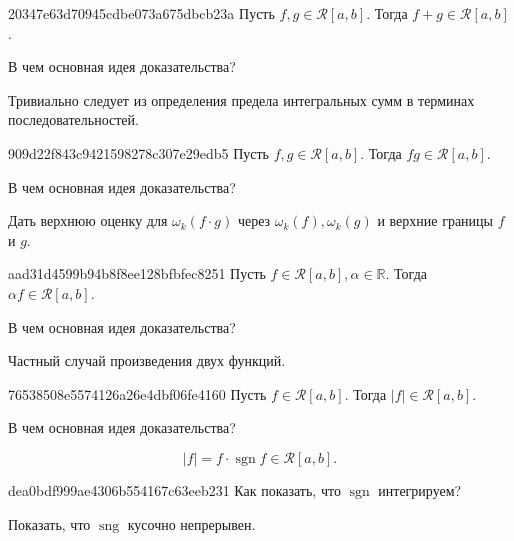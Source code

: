 \begin{note}{20347e63d70945cdbe073a675dbcb23a}
    Пусть \({ f, g \in \mathcal R[a, b] }\). Тогда \({ f + g \in \mathcal R[a, b] }\).

    В чем основная идея доказательства?

    \begin{cloze}{1}
        Тривиально следует из определения предела интегральных сумм в терминах последовательностей.
    \end{cloze}
\end{note}

\begin{note}{909d22f843c9421598278c307e29edb5}
    Пусть \({ f, g \in \mathcal R[a, b] }\). Тогда \({ fg \in \mathcal R[a, b] }\).

    В чем основная идея доказательства?

    \begin{cloze}{1}
        Дать верхнюю оценку для \({ \omega_k(f \cdot g) }\) через \({ \omega_k(f), \omega_k(g) }\) и верхние границы \({ f }\) и \({ g }\).
    \end{cloze}
\end{note}

\begin{note}{aad31d4599b94b8f8ee128bfbfec8251}
    Пусть \({ f \in \mathcal R[a, b], \alpha \in \mathbb R }\). Тогда \({ \alpha f \in \mathcal R[a, b] }\).

    В чем основная идея доказательства?

    \begin{cloze}{1}
        Частный случай произведения двух функций.
    \end{cloze}
\end{note}

\begin{note}{76538508e5574126a26e4dbf06fe4160}
    Пусть \({ f \in \mathcal R[a, b] }\). Тогда \({ \left\lvert f \right\rvert \in \mathcal R[a, b] }\).

    В чем основная идея доказательства?

    \begin{cloze}{1}
        \[
            \left\lvert f \right\rvert = f \cdot \operatorname{sgn} f \in \mathcal R[a, b].
        \]
    \end{cloze}
\end{note}

\begin{note}{dea0bdf999ae4306b554167c63eeb231}
    Как показать, что \({ \operatorname{sgn} }\) интегрируем?

    \begin{cloze}{1}
        Показать, что \({ \operatorname{sng} }\) кусочно непрерывен.
    \end{cloze}
\end{note}


